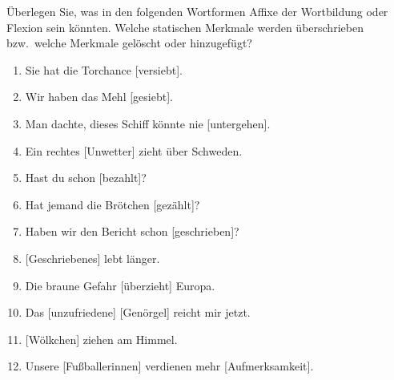 \Uebung[\twostar] \label{u63} Überlegen Sie, was in den folgenden Wortformen Affixe der Wortbildung oder Flexion sein könnten.
Welche statischen Merkmale werden überschrieben bzw.\ welche Merkmale gelöscht oder hinzugefügt?

\begin{enumerate}\Lf
  \item Sie hat die Torchance {[versiebt]}.
  \item Wir haben das Mehl {[gesiebt]}.
  \item Man dachte, dieses Schiff könnte nie {[untergehen]}.
  \item Ein rechtes {[Unwetter]} zieht über Schweden.
  \item Hast du schon {[bezahlt]}?
  \item Hat jemand die Brötchen {[gezählt]}?
  \item Haben wir den Bericht schon {[geschrieben]}?
  \item {[Geschriebenes]} lebt länger.
  \item Die braune Gefahr {[überzieht]} Europa.
  \item Das {[unzufriedene]} {[Genörgel]} reicht mir jetzt.
  \item {[Wölkchen]} ziehen am Himmel.
  \item Unsere {[Fußballerinnen]} verdienen mehr {[Aufmerksamkeit]}.
\end{enumerate}

